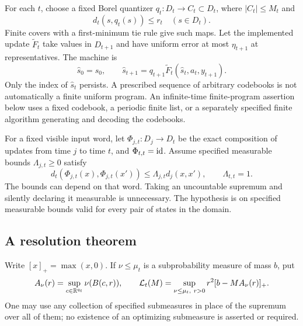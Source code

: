 For each $t$, choose a fixed Borel quantizer $q_t:D_t\to C_t\subset D_t$,
where $|C_t|\le M_t$ and
\[
 d_t(s,q_t(s))\le r_t\quad(s\in D_t).
\]
Finite covers with a first-minimum tie rule give such maps. Let the
implemented update $\widetilde F_t$ take values in $D_{t+1}$ and have
uniform error at most $\eta_{t+1}$ at representatives. The machine is
\begin{equation}\label{eq:v2-machine}
 \widehat s_0=s_0,\qquad
 \widehat s_{t+1}=q_{t+1}\widetilde F_t(\widehat s_t,a_t,y_{t+1}).
\end{equation}
Only the index of $\widehat s_t$ persists. A prescribed sequence of
arbitrary codebooks is not automatically a finite uniform program. An
infinite-time finite-program assertion below uses a fixed codebook, a
periodic finite list, or a separately specified finite algorithm generating
and decoding the codebooks.

For a fixed visible input word, let $\Phi_{j,t}:D_j\to D_t$ be the exact
composition of updates from time $j$ to time $t$, and $\Phi_{t,t}=\operatorname{id}$.
Assume specified measurable bounds $\Lambda_{j,t}\ge0$ satisfy
\begin{equation}\label{eq:v2-suffix}
 d_t(\Phi_{j,t}(x),\Phi_{j,t}(x'))
 \le\Lambda_{j,t}d_j(x,x'),\qquad \Lambda_{t,t}=1.
\end{equation}
The bounds can depend on that word. Taking an uncountable supremum and
silently declaring it measurable is unnecessary. The hypothesis is on
specified measurable bounds valid for every pair of states in the domain.

\subsection{A resolution theorem}
Write $[x]_+=\max(x,0)$. If $\nu\le\mu_t$ is a subprobability measure of
mass $b$, put
\[
 A_\nu(r)=\sup_{c\in\mathbb R^{q_t}}\nu(B(c,r)),\qquad
 \mathcal L_t(M)=\sup_{\nu\le\mu_t,\ r>0}
          r^2[b-MA_\nu(r)]_+.
\]
One may use any collection of specified submeasures in place of the
supremum over all of them; no existence of an optimizing submeasure is
asserted or required.

